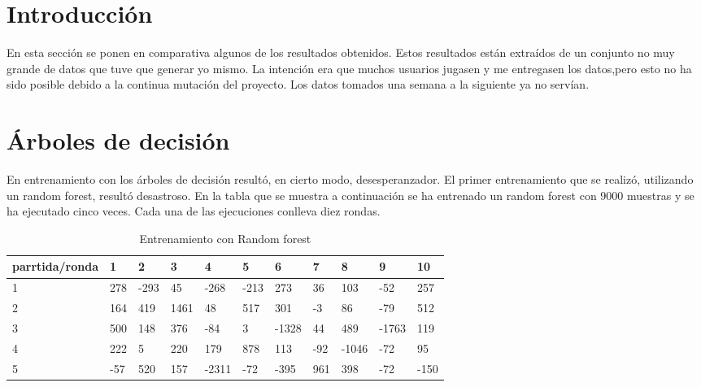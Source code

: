 

\section{Introducción}
En esta sección se ponen en comparativa algunos de los resultados obtenidos. Estos resultados están extraídos de un conjunto no muy grande de datos que tuve que generar yo mismo. La intención era que muchos usuarios jugasen y me entregasen los datos,pero esto no ha sido posible debido a la continua mutación del proyecto. Los datos tomados una semana a la siguiente ya no servían. 

\section{Árboles de decisión}

En entrenamiento con los árboles de decisión resultó, en cierto modo, desesperanzador. El primer entrenamiento que se realizó, utilizando un random forest, resultó desastroso. En la tabla que se muestra a continuación se ha entrenado un random forest con $9000$ muestras y se ha ejecutado cinco veces. Cada una de las ejecuciones conlleva diez rondas.

\begin{table}[h!]
\centering
\begin{tabular}{|l|l|l|l|l|l|l|l|l|l|l|}
\hline
\rowcolor[HTML]{C0C0C0} 
parrtida/ronda & 1   & 2    & 3    & 4     & 5    & 6     & 7   & 8     & 9     & 10   \\ \hline
1              & 278 & -293 & 45   & -268  & -213 & 273   & 36  & 103   & -52   & 257  \\ \hline
\rowcolor[HTML]{EFEFEF} 
2              & 164 & 419  & 1461 & 48    & 517  & 301   & -3  & 86    & -79   & 512  \\ \hline
3              & 500 & 148  & 376  & -84   & 3    & -1328 & 44  & 489   & -1763 & 119  \\ \hline
\rowcolor[HTML]{EFEFEF} 
4              & 222 & 5    & 220  & 179   & 878  & 113   & -92 & -1046 & -72   & 95   \\ \hline
5              & -57 & 520  & 157  & -2311 & -72  & -395  & 961 & 398   & -72   & -150 \\ \hline
\end{tabular}
\caption{Entrenamiento con Random forest}
\label{tab:RndForest}
\end{table}

